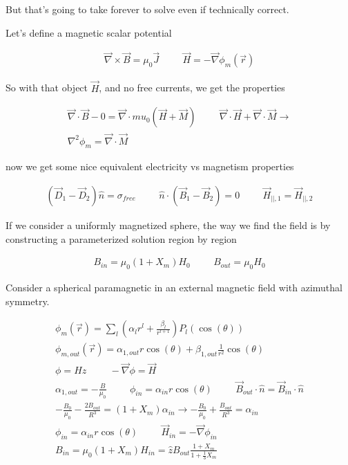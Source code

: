 \documentclass[fleqn]{report}
\newcommand{\hp}{\hspace{1cm}}
\newcommand{\equations} [1] {
\begin{gather*}
#1
\end{gather*}
}
\begin{document}
But that's going to take forever to solve even if technically correct. 

Let's define a magnetic scalar potential 

\equations{
    \vec \nabla \times \vec B 
    =
    \mu_0 \vec J 
    \hp 
    \vec H 
    =
    - \vec \nabla 
    \phi_m(\vec r)
}

So with that object $\vec H$, and no free currents, we get the properties 

\equations{
    \vec \nabla \cdot \vec B - 0 
    =
    \vec \nabla \cdot mu_0 (\vec H + \vec M)
    \hp 
    \vec \nabla \cdot \vec H
    +
    \vec \nabla \cdot \vec M
    \rightarrow 
    \\
    \nabla^2 \phi_m 
    = 
    \vec \nabla \cdot \vec M 
}

now we get some nice equivalent electricity vs magnetism properties 
\equations{
    (\vec D_1 - \vec D_2) \hat n 
    =
    \sigma_{free}
    \hp 
    \hat n \cdot 
    (\vec B_1 - \vec B_2)
    =
    0
    \hp 
    \vec H_{||, 1}
    =
    \vec H_{||, 2}
}

If we consider a uniformly magnetized sphere, the way we find the field 
is by constructing a parameterized solution 
region by region 

\equations{
    B_{in}
    =
    \mu_0 (1 + X_m) H_0 
    \hp 
    B_{out}
    =
    \mu_0 H_0 
}

Consider a spherical paramagnetic in an external magnetic field 
with azimuthal symmetry. 
\equations{
    \phi_m(\vec r)
    =
    \sum_l
    \left(
        \alpha_l r^l 
        +
        \frac{\beta_l}{r^{l+1}}
    \right)
    P_l(\cos(\theta))
    \\
    \phi_{m, out}(\vec r)
    =
    \alpha_{1, out} r \cos(\theta)
    +
    \beta_{1, out}
    \frac{1}{r^2} \cos(\theta)
    \\
    \phi = Hz 
    \hp 
    - \vec \nabla \phi = \vec H 
    \\
    \alpha_{1, out}
    =
    - \frac{B}{\mu_0}
    \hp 
    \phi_{in}
    =
    \alpha_{in} r \cos(\theta)
    \hp 
    \vec B_{out} \cdot \hat n 
    =
    \vec B_{in} \cdot \hat n 
    \\
    - \frac{B_0}{\mu_0}
    -
    \frac{2 B_{out}}{R^3}
    =
    (1 + X_m)
    \alpha_{in}
    \rightarrow 
    - \frac{B_0}{\mu_0}
    +
    \frac{B_{out}}{R^3}
    =
    \alpha_{in}
    \\
    \phi_{in} 
    =
    \alpha_{in} r \cos(\theta) 
    \hp 
    \vec H_{in} = - \vec \nabla \phi_{in}
    \\
    B_{in} 
    =
    \mu_0 (1 + X_m) H_{in}
    =
    \hat z 
    B_{out} \frac{1 + X_m}{1 + \frac{1}{3} X_m}
}
\end{document}

